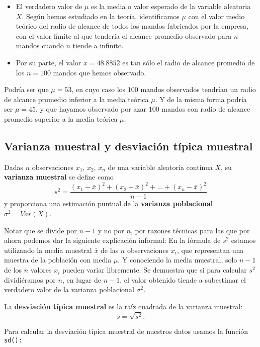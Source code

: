 \documentclass[
  degree=mecinf,
  title=normal,
  toc=normal,
  bib=normal]{mnye}
\providecommand{\tightlist}{%
  \setlength{\itemsep}{0pt}\setlength{\parskip}{0pt}}
\begin{document}
\begin{itemize}
\tightlist
\item
  El verdadero valor de \(\mu\) es la media o valor esperado de la variable aleatoria \(X\). Según hemos estudiado en la teoría, identificamos \(\mu\) con el valor medio teórico del radio de alcance de todos los mandos fabricados por la empresa, con el valor límite al que tendería el alcance promedio observado para \(n\) mandos cuando \(n\) tiende a infinito.\\
\item
  Por su parte, el valor \(\overline{x} = 48.8852\) es tan sólo el radio de alcance promedio de los \(n=100\) mandos que hemos observado.
\end{itemize}

Podría ser que \(\mu=53\), en cuyo caso los \(100\) mandos observados tendrían un radio de alcance promedio inferior a la media teórica \(\mu\). Y de la misma forma podría ser \(\mu=45\), y que hayamos observado por azar \(100\) mandos con radio de alcance promedio superior a la media teórica \(\mu\).

\hypertarget{sd}{%
\subsection{Varianza muestral y desviación típica muestral}\label{sd}}

Dadas \(n\) observaciones \(x_1\), \(x_2\), \(x_n\) de una variable aleatoria continua \(X\), su \textbf{varianza muestral} se define como
\[
    s^2 = \frac{(x_1-\bar{x})^2 + (x_2-\bar{x})^2 + \dots + (x_n-\bar{x})^2}{n-1}
\]
y proporciona una estimación puntual de la \textbf{varianza poblacional} \(\sigma^2 = Var(X)\).

Notar que se divide por \(n-1\) y no por \(n\), por razones técnicas para las que por ahora podemos dar la siguiente explicación informal: En la fórmula de \(s^2\) estamos utilizando la media muestral \(\bar x\) de las \(n\) observaciones \(x_i\), que representan una muestra de la población con media \(\mu\). Y conociendo la media muestral, solo \(n-1\) de los \(n\) valores \(x_i\) pueden variar libremente. Se demuestra que si para calcular \(s^2\) dividiéramos por \(n\), en lugar de \(n-1\), el valor obtenido tiende a subestimar el verdadero valor de la varianza poblacional \(\sigma^2\).

La \textbf{desviación típica muestral} es la raíz cuadrada de la varianza muestral:
\[s=\sqrt{s^2}.\]

Para calcular la desviación típica muestral de nuestros datos usamos la función \texttt{sd():}
\end{document}
